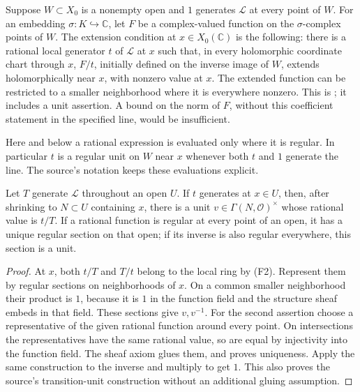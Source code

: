 Suppose \(W\subset X_0\) is a nonempty open and \(1\) generates
\(\mathcal L\) at every point of \(W\).
For an embedding \(\sigma:K\hookrightarrow\mathbb C\), let \(F\)
be a complex-valued function on the \(\sigma\)-complex points of \(W\).
The extension condition at \(x\in X_0(\mathbb C)\) is the following:
there is a rational local generator \(t\) of \(\mathcal L\) at \(x\)
such that, in every holomorphic coordinate chart through \(x\),
\(F/t\), initially defined on the inverse image of \(W\), extends
holomorphically near \(x\), with nonzero value at \(x\).
The extended function can be restricted to a smaller neighborhood
where it is everywhere nonzero.
This is ; it includes a unit assertion.
A bound on the norm of \(F\), without this coefficient statement in
the specified line, would be insufficient.

Here and below a rational expression is evaluated only where it is
regular.  In particular \(t\) is a regular unit on
\(W\) near \(x\) whenever both \(t\) and \(1\) generate the line.
The source's  notation keeps these evaluations explicit.

\begin{srlemma}
\label{lem:faithful-line-local-units}
Let \(T\) generate \(\mathcal L\) throughout an open \(U\).
If \(t\) generates at \(x\in U\), then, after shrinking to
\(N\subset U\) containing \(x\), there is a unit
\(v\in\Gamma(N,\mathcal O)^\times\) whose rational value is \(t/T\).
If a rational function is regular at every point of an open, it has
a unique regular section on that open; if its inverse is also regular
everywhere, this section is a unit.
\end{srlemma}
\begin{proof}
At \(x\), both \(t/T\) and \(T/t\) belong to the local ring by (F2).
Represent them by regular sections on neighborhoods of \(x\).
On a common smaller neighborhood their product is \(1\), because
it is \(1\) in the function field and the structure sheaf embeds
in that field.  These sections give \(v,v^{-1}\).
For the second assertion choose a representative of the given
rational function around every point.
On intersections the representatives have the same rational value,
so are equal by injectivity into the function field.
The sheaf axiom glues them, and proves uniqueness.
Apply the same construction to the inverse and multiply to get \(1\).
This also proves the source's transition-unit construction without
an additional gluing assumption.
\end{proof}


